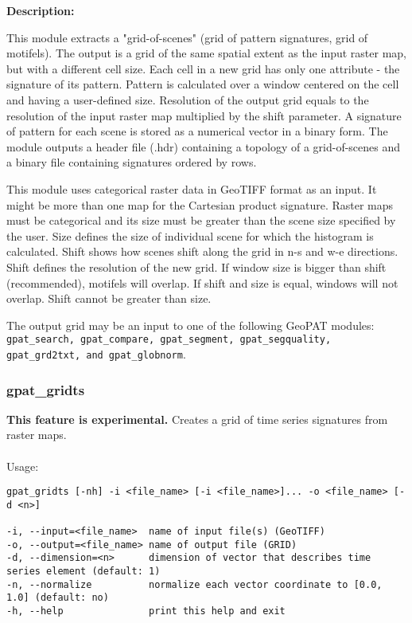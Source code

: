 {\bf Description:}

This module extracts a "grid-of-scenes" (grid of pattern signatures, grid of motifels).
The output is a grid of the same spatial extent as the input raster map, but with a different cell size.
Each cell in a new grid has only one attribute - the signature of its pattern. 
Pattern is calculated over a window centered on the cell and having a user-defined size.
Resolution of the output grid equals to the resolution of the input raster map multiplied by the shift parameter. 
A signature of pattern for each scene is stored as a numerical vector in a binary form.
The module outputs a header file (.hdr) containing a topology of a grid-of-scenes and a binary file containing signatures ordered by rows.

This module uses categorical raster data in GeoTIFF format as an input. 
It might be more than one map for the Cartesian product signature. 
Raster maps must be categorical and its size must be greater than the scene size specified by the user. 
Size defines the size of individual scene for which the histogram is calculated. 
Shift shows how scenes shift along the grid in n-s and w-e directions. 
Shift defines the resolution of the new grid.
If window size is bigger than shift (recommended), motifels will overlap.
If shift and size is equal, windows will not overlap. Shift cannot be greater than size. 

The output grid may be an input to one of the following GeoPAT modules: {\tt gpat\_search, gpat\_compare, gpat\_segment, gpat\_segquality, gpat\_grd2txt, and gpat\_globnorm}.

\subsubsection{gpat\_gridts}

\textbf{This feature is experimental.}
Creates a grid of time series signatures from raster maps.
\\\\
Usage:

\begin{minipage}{\linewidth}
\begin{lstlisting}
gpat_gridts [-nh] -i <file_name> [-i <file_name>]... -o <file_name> [-d <n>]

-i, --input=<file_name>  name of input file(s) (GeoTIFF)
-o, --output=<file_name> name of output file (GRID)
-d, --dimension=<n>      dimension of vector that describes time series element (default: 1)
-n, --normalize          normalize each vector coordinate to [0.0, 1.0] (default: no)
-h, --help               print this help and exit
\end{lstlisting}
\end{minipage}

